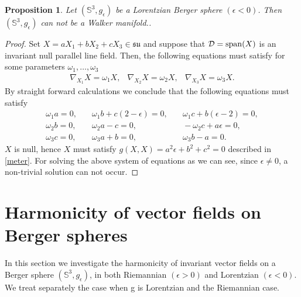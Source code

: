 \documentclass[11pt,oneside,leqno]{amsart}
\theoremstyle{plain}
\newtheorem{prop}[theorem]{Proposition}
\begin{document}
\begin{prop} 
Let $({{\mathbb S}}^3, g_{\epsilon})$ be a Lorentzian Berger sphere $(\epsilon<0)$. Then $({{\mathbb S}}^3, g_{\epsilon})$ can not be a Walker manifold..
\end{prop}
\begin{proof}
Set $X =aX_1+bX_2+cX_3\in {{\mathfrak{su}}}$ and suppose that ${\mathcal D}={\rm span}(X)$ is an invariant null parallel line field. Then, the following equations must satisfy for some parameters $\omega_1,\dots,\omega_3$
$$
\begin{array}{lll}
\nabla_{X_1}X=\omega_1X,&\nabla_{X_2}X=\omega_2X,&\nabla_{X_3}X=\omega_3X.
\end{array}
$$
By straight forward calculations we conclude that the following equations must satisfy
$$
\begin{array}{ccc}
\omega_1a=0,&\quad \omega_1b+c(2-\epsilon)=0,&\quad\omega_1c+b(\epsilon-2)=0,\\
\omega_2b=0,&\quad \omega_2a-c=0,&\quad
 -\omega_2c+a\epsilon=0,\\
\omega_3c=0,&\quad \omega_3a+b=0,&\quad
\omega_3b-a=0.
\end{array}
$$
$X$ is null, hence $X$ must satisfy $g(X,X)=a^2\epsilon+b^2+c^2=0$ described in \eqref{meter}. For solving the above system of equations as we can see, since $\epsilon\neq 0$, a non-trivial solution can not occur.
  \end{proof}
  
\section{Harmonicity of vector fields on Berger spheres}
In this section we investigate the harmonicity of invariant vector fields on a Berger sphere  $({{\mathbb S}}^3, g_{\epsilon})$, in both Riemannian $(\epsilon>0)$ and Lorentzian $(\epsilon<0)$.
We treat separately the case when g is Lorentzian
and the Riemannian case.
\end{document}
